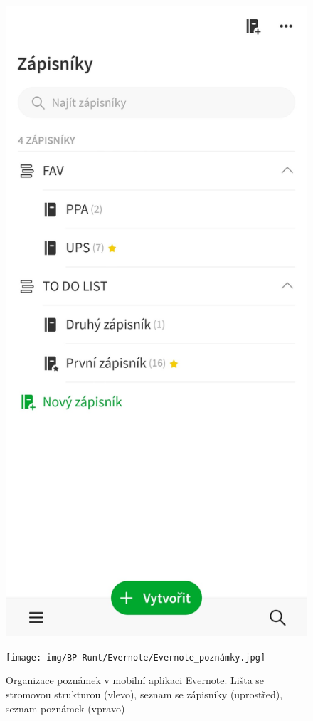 \documentclass[czech, bc, kiv, he, iso690numb]{fasthesis}
\begin{document}
\begin{figure}[h!]
\begin{minipage}[h]{0.3\textwidth}
  \end{minipage}
  \hfill
  \begin{minipage}[h]{0.3\textwidth}
    \includegraphics[width=\textwidth]{img/BP-Runt/Evernote/Evernote_hierarchie_v_seznamu.jpg}
  \end{minipage}
  \hfill
  \begin{minipage}[h]{0.3\textwidth}
    \texttt{[image: img/BP-Runt/Evernote/Evernote\_poznámky.jpg]}
  \end{minipage}
  \caption{Organizace poznámek v mobilní aplikaci Evernote. Lišta se stromovou strukturou (vlevo), seznam se zápisníky (uprostřed), seznam poznámek (vpravo)}
  \label{fig:hierarchie_Evernote}
\end{figure}
\end{document}
